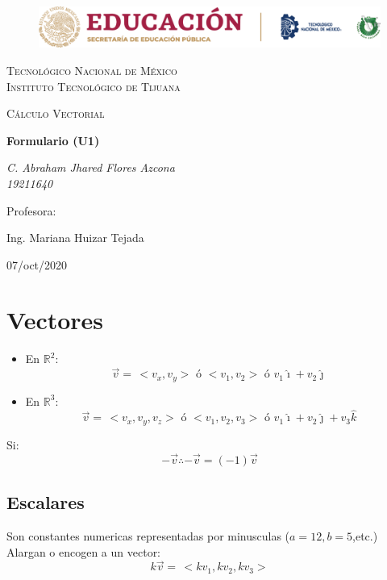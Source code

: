 \documentclass[letterpaper, 12pt]{article}
\begin{document}
    
    \begin{titlepage}
        \begin{figure}[ht]
            \centering
            \includegraphics[width=15cm]{logosITT.png}
        \end{figure}
        \centering
        {\scshape\LARGE Tecnológico Nacional de México\\Instituto Tecnológico de Tijuana\par}
        \vspace{1cm}
        {\scshape\Large Cálculo Vectorial\par}
        \vspace{1.5cm}
        {\huge\bfseries Formulario (U1)\par}
        \vspace{2cm}
        {\Large\itshape C. Abraham Jhared Flores Azcona\\19211640\par}
        \vfill
        Profesora: \par
        Ing. Mariana Huizar Tejada
        
        \vfill

        {\large 07/oct/2020}
    \end{titlepage}

    \newpage
    \thispagestyle{empty}
    \tableofcontents

    \newpage
    \setcounter{page}{1}
    \thispagestyle{fancy}
    \section{Vectores}
    \begin{itemize}
        \item En \(\mathbb{R}^2\):\[\vec{v}=\,<\!v_x,v_y\!> \text{ ó } <\!v_1,v_2\!> \text{ ó } v_1\hat{\imath}+v_2\hat{\jmath}\]
        \item En \(\mathbb{R}^3\): \[\vec{v}=\,<\!v_x,v_y,v_z\!> \text{ ó } <\!v_1,v_2,v_3\!> \text{ ó } v_1\hat{\imath}+v_2\hat{\jmath}+v_3\hat{k}\]
    \end{itemize}
    Si:\[-\vec{v}\therefore-\vec{v}=(-1)\vec{v}\]
    \subsection{Escalares}
    Son constantes numericas representadas por minusculas (\(a=12,b=5\),etc.) Alargan o encogen a un vector:
    \[k\vec{v}=\,<\!kv_1,kv_2,kv_3\!>\]
\end{document}
